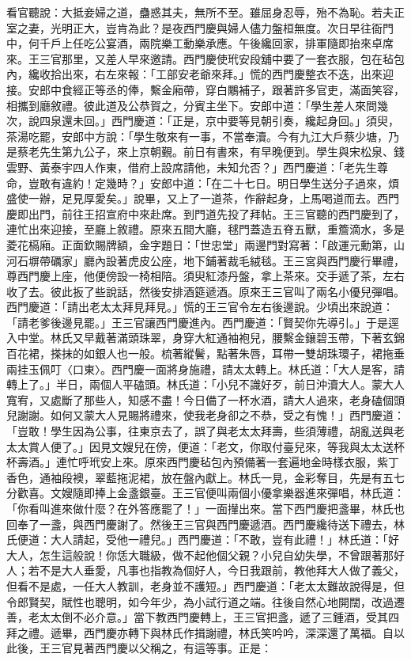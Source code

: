 看官聽說：大抵妾婦之道，蠱惑其夫，無所不至。雖屈身忍辱，殆不為恥。若夫正室之妻，光明正大，豈肯為此？是夜西門慶與婦人儘力盤桓無度。次日早往衙門中，何千戶上任吃公宴酒，兩院樂工動樂承應。午後纔回家，排軍隨即抬來卓席來。王三官那里，又差人早來邀請。西門慶使玳安段舖中要了一套衣服，包在毡包內，纔收拾出來，右左來報：「工部安老爺來拜。」慌的西門慶整衣不迭，出來迎接。安郎中食經正等丞的俸，繫金廂帶，穿白鷴補子，跟著許多官吏，滿面笑容，相攜到廳敘禮。彼此道及公恭賀之，分賓主坐下。安郎中道：「學生差人來問幾次，說四泉還未回。」西門慶道：「正是，京中要等見朝引奏，纔起身回。」須臾，茶湯吃罷，安郎中方說：「學生敬來有一事，不當奉瀆。今有九江大戶蔡少塘，乃是蔡老先生第九公子，來上京朝覲。前日有書來，有早晚便到。學生與宋松泉、錢雲野、黃泰宇四人作東，借府上設席請他，未知允否？」西門慶道：「老先生尊命，豈敢有違約！定幾時？」安郎中道：「在二十七日。明日學生送分子過來，煩盛使一辦，足見厚愛矣。」說畢，又上了一道茶，作辭起身，上馬喝道而去。西門慶即出門，前往王招宣府中來赴席。到門道先投了拜帖。王三官聽的西門慶到了，連忙出來迎接，至廳上敘禮。原來五間大廳，毬門蓋造五脊五獸，重簷滴水，多是菱花槅廂。正面欽賜牌額，金字題日：「世忠堂」兩邊門對寫著：「啟運元勳第，山河石塀帶礪家」廳內設著虎皮公座，地下鋪著裁毛絨毯。王三宮與西門慶行畢禮，尊西門慶上座，他便傍設一椅相陪。須臾紅漆丹盤，拿上茶來。交手遞了茶，左右收了去。彼此扳了些說話，然後安排酒筵遞酒。原來王三官叫了兩名小優兒彈唱。西門慶道：「請出老太太拜見拜見。」慌的王三官令左右後邊說。少頃出來說道：「請老爹後邊見罷。」王三官讓西門慶進內。西門慶道：「賢契你先導引。」于是逕入中堂。林氏又早戴著滿頭珠翠，身穿大紅通袖袍兒，腰繫金鑲碧玉帶，下著玄錦百花裙，搽抹的如銀人也一般。梳著縱鬢，點著朱唇，耳帶一雙胡珠環子，裙拖垂兩挂玉佩叮〈口東〉。西門慶一面將身施禮，請太太轉上。林氏道：「大人是客，請轉上了。」半日，兩個人平磕頭。林氏道：「小兒不識好歹，前日沖瀆大人。蒙大人寬宥，又處斷了那些人，知感不盡！今日備了一杯水酒，請大人過來，老身磕個頭兒謝謝。如何又蒙大人見賜將禮來，使我老身卻之不恭，受之有愧！」西門慶道：「豈敢！學生因為公事，往東京去了，誤了與老太太拜壽，些須薄禮，胡亂送與老太太賞人便了。」因見文嫂兒在傍，便道：「老文，你取付臺兒來，等我與太太送杯杯壽酒。」連忙呼玳安上來。原來西門慶毡包內預備著一套遍地金時樣衣服，紫丁香色，通袖段襖，翠藍拖泥裙，放在盤內獻上。林氏一見，金彩奪目，先是有五七分歡喜。文嫂隨即捧上金盞銀臺。王三官便叫兩個小優拿樂器進來彈唱，林氏道：「你看叫進來做什麼？在外答應罷了！」一面攆出來。當下西門慶把盞畢，林氏也回奉了一盞，與西門慶謝了。然後王三官與西門慶遞酒。西門慶纔待送下禮去，林氏便道：大人請起，受他一禮兒。」西門慶道：「不敢，豈有此禮！」林氏道：「好大人，怎生這般說！你恁大職級，做不起他個父親？小兒自幼失學，不曾跟著那好人；若不是大人垂愛，凡事也指教為個好人，今日我跟前，教他拜大人做了義父，但看不是處，一任大人教訓，老身並不護短。」西門慶道：「老太太難故說得是，但令郎賢契，賦性也聰明，如今年少，為小試行道之端。往後自然心地開闊，改過遷善，老太太倒不必介意。」當下教西門慶轉上，王三官把盞，遞了三鍾酒，受其四拜之禮。遞畢，西門慶亦轉下與林氏作揖謝禮，林氏笑吟吟，深深還了萬福。自以此後，王三官見著西門慶以父稱之，有這等事。正是：

